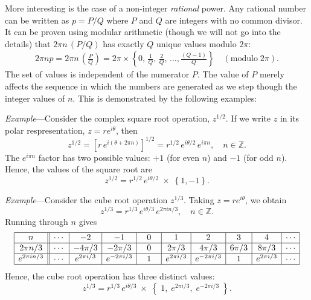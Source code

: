\documentclass[10pt,a4paper]{article}
\begin{document}
More interesting is the case of a non-integer \textit{rational}
power. Any rational number can be written as $p = P/Q$ where $P$ and
$Q$ are integers with no common divisor.  It can be proven using
modular arithmetic (though we will not go into the details) that $2\pi
n\, (P/Q)$ has exactly $Q$ unique values modulo $2\pi$:
\begin{align}
  2 \pi n p = 2\pi n\, \left(\frac{P}{Q}\right) = 2\pi \times \left\{0,\, \frac{1}{Q},\, \frac{2}{Q},\, \dots, \frac{(Q-1)}{Q} \right\} \quad(\mathrm{modulo} \; 2\pi).
\end{align}
The set of values is independent of the numerator $P$.  The value of
$P$ merely affects the sequence in which the numbers are generated as
we step though the integer values of $n$. This is demonstrated by the
following examples:

\begin{framed} \noindent
\textit{Example}---Consider the complex square root operation,
$z^{1/2}$. If we write $z$ in its polar respresentation, $z = r
e^{i\theta}$, then
\begin{equation}
  z^{1/2} = \left[r \, e^{i(\theta + 2 \pi n)} \right]^{1/2} = r^{1/2} \, e^{i\theta/2} \, e^{i \pi n}, \quad n \in \mathbb{Z}.
\end{equation}
The $e^{i\pi n}$ factor has two possible values: $+1$ (for even $n$) and $-1$ (for odd $n$). Hence, the values of the square root are
\begin{equation}
  z^{1/2} = r^{1/2} \, e^{i\theta/2} \;\times\; \left\{1, -1\right\}.
\end{equation}
\end{framed}

\begin{framed} \noindent
  \textit{Example}---Consider the cube root operation $z^{1/3}$.
  Taking $z = r e^{i\theta}$, we obtain
\begin{equation}
z^{1/3} = r^{1/3} \, e^{i\theta/3} \, e^{2\pi i n/3}, \quad n \in \mathbb{Z}.
\end{equation}
Running through $n$ gives
\begin{align*}
  \begin{array}{|c||c|c|c|c|c|c|c|c|c|} \hline n &\cdots & -2 & -1 & 0 & 1 & 2 & 3 & 4 & \cdots \\ \hline 2\pi n / 3 &\cdots & -4\pi/3 & -2\pi/3 & 0 & 2\pi/3 & 4\pi/3 & 6\pi/3 & 8\pi/3 & \cdots \\ \hline e^{2\pi i n/3} &\cdots & e^{2\pi i /3} & e^{-2\pi i /3} & \;\,\;1\;\,\; & e^{2\pi i /3} & e^{-2\pi i /3} & \;\,\;1\;\,\; & e^{2\pi i /3} & \cdots \\ \hline \end{array}
\end{align*}
Hence, the cube root operation has three distinct values:
\begin{equation}
  z^{1/3} = r^{1/3} \, e^{i\theta/3} \;\times\; \left\{\;
  1, \;e^{2\pi i /3},\; e^{-2\pi i /3}\; \right\}.
\end{equation}
\end{framed}
\end{document}
